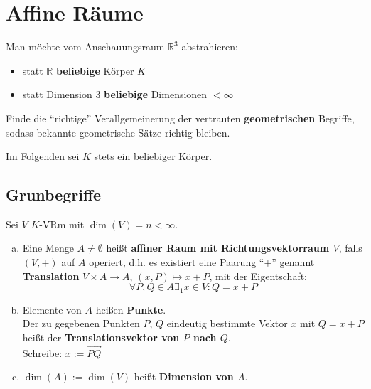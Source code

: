 \documentclass[parskip,a4paper,twoside,DIV15,BCOR12mm]{scrbook}
\begin{document}
\chapter{Affine Räume}

Man möchte vom Anschauungsraum $\mathbb{R}^3$ abstrahieren:\\
\begin{itemize}
\item statt $\mathbb{R}$ \textbf{beliebige} Körper $K$
\item statt Dimension $3$ \textbf{beliebige} Dimensionen $< \infty$
\end{itemize}

\begin{task}
Finde die "`richtige"' Verallgemeinerung der vertrauten \textbf{geometrischen} 
Begriffe, sodass bekannte geometrische Sätze richtig bleiben.
\end{task}

Im Folgenden sei $K$ stets ein beliebiger Körper.

\section{Grunbegriffe}
\begin{definition}
Sei $V$ $K$-VRm mit $\dim(V)=n<\infty$.
\begin{enumerate}[(a)]
\item Eine Menge $A \ne \emptyset$ heißt \textbf{affiner Raum mit Richtungsvektorraum $V$},
falls $(V,+)$ auf $A$ operiert, d.h. es existiert eine Paarung "`$+$"' genannt
\textbf{Translation} $V \times A \to A$, $(x,P) \mapsto x+P$, mit der Eigentschaft:
\[\forall P,Q\in A\exists_1 x\in V: Q=x+P\]
\item Elemente von $A$ heißen \textbf{Punkte}.\\
Der zu gegebenen Punkten $P$, $Q$ eindeutig bestimmte Vektor $x$ mit $Q=x+P$ heißt
der \textbf{Translationsvektor von $P$ nach $Q$}.\\
Schreibe: $x:=\overrightarrow{PQ}$
\item $\dim(A) := \dim(V)$ heißt \textbf{Dimension von $A$}.
\end{enumerate}
\end{definition}

\begin{comment}
\begin{enumerate}
\item Vorsicht in 1. wird das Zeichen "`+"' für verschiedene Verknüpfungen benutzt.
\item Es gilt für $P,Q,R,\in A:$
\begin{align*}
\overrightarrow{PP}&=0\\
\overrightarrow{PQ}+\overrightarrow{QR} &= \overrightarrow{PR}\\
\overrightarrow{QP}&=-\overrightarrow{PQ}
\end{align*} 
\item $A$ besteht aus genau einer Bahn:
\[\forall P\in A: A=V+P:=\{x+P\mid x\in V\}\]
\end{enumerate}
\end{comment}
\end{document}
